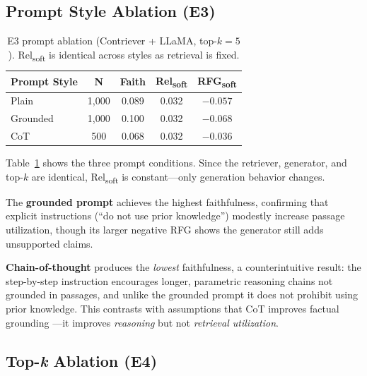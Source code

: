 \documentclass[11pt]{article}
\begin{document}
\subsection{Prompt Style Ablation (E3)}

\begin{table}[t]
\centering
\small
\setlength{\tabcolsep}{5pt}
\begin{tabular}{@{} l c c c c @{}}
\toprule
\textbf{Prompt Style} & \textbf{N}
  & \textbf{Faith} & \textbf{Rel\textsubscript{soft}}
  & \textbf{RFG\textsubscript{soft}} \\
\midrule
Plain    & 1{,}000 & 0.089 & 0.032 & $-0.057$ \\
Grounded & 1{,}000 & 0.100 & 0.032 & $-0.068$ \\
CoT      &   500   & 0.068 & 0.032 & $-0.036$ \\
\bottomrule
\end{tabular}
\caption{
  E3 prompt ablation (Contriever + LLaMA, top-$k{=}5$).
  Rel\textsubscript{soft} is identical across styles as retrieval is fixed.
}
\label{tab:e3}
\end{table}

Table~\ref{tab:e3} shows the three prompt conditions.
Since the retriever, generator, and top-$k$ are identical, Rel\textsubscript{soft}
is constant---only generation behavior changes.

The \textbf{grounded prompt} achieves the highest faithfulness,
confirming that explicit instructions (``do not use prior knowledge'')
modestly increase passage utilization, though its larger negative RFG shows
the generator still adds unsupported claims.

\textbf{Chain-of-thought} produces the \emph{lowest} faithfulness, a
counterintuitive result: the step-by-step instruction encourages longer,
parametric reasoning chains not grounded in passages, and unlike the
grounded prompt it does not prohibit using prior knowledge.
This contrasts with assumptions that CoT improves factual grounding
\cite{wei2022chain}---it improves \emph{reasoning} but not
\emph{retrieval utilization}.

\subsection{Top-\textit{k} Ablation (E4)}
\end{document}
